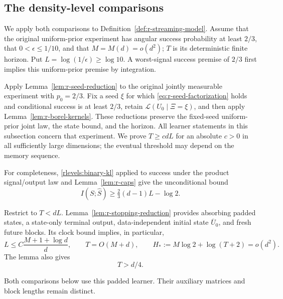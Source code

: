 \subsection{The density-level comparisons}
\label{rlevels:endpoints}

We apply both comparisons to Definition~\ref{def:r-streaming-model}.
Assume that the original uniform-prior experiment has angular success
probability at least \(2/3\), that \(0<\epsilon\le1/10\), and that
\(M=M(d)=o(d^2)\); \(T\) is its deterministic finite horizon.  Put
\(L=\log(1/\epsilon)\ge\log10\).  A worst-signal success premise of
\(2/3\) first implies this uniform-prior premise by integration.

Apply Lemma~\ref{lem:r-seed-reduction} to the original jointly
measurable experiment with \(p_0=2/3\).  Fix a seed \(\xi\) for which
\eqref{eq:r-seed-factorization} holds and conditional success is at
least \(2/3\), retain \(\mathcal L(U_0\mid\Xi=\xi)\), and then apply
Lemma~\ref{lem:r-borel-kernels}.  These reductions preserve the fixed-seed
uniform-prior joint law, the state bound, and the horizon.  All learner
statements in this subsection concern that experiment.  We prove
\(T\ge c dL\) for an absolute \(c>0\) in all sufficiently large
dimensions; the eventual threshold may depend on the memory sequence.

For completeness, \eqref{rlevels:binary-kl} applied to success
under the product signal/output law and Lemma~\ref{lem:r-caps}
give the unconditional bound
\begin{equation}\label{rlevels:output-information}
 I(S;\widehat S)\ge\tfrac23(d-1)L-\log2.
\end{equation}

Restrict to \(T<dL\).  Lemma~\ref{lem:r-stopping-reduction}
provides absorbing padded states, a state-only terminal output,
data-independent initial state \(\overline U_0\), and fresh future
blocks.  Its clock bound implies, in particular,
\begin{equation}\label{rlevels:clock}
 L\le C\frac{M+1+\log d}{d},\qquad T=O(M+d),\qquad
 H_*:=M\log2+\log(T+2)=o(d^2).
\end{equation}
The lemma also gives
\begin{equation}\label{rlevels:linear}
 T>d/4.
\end{equation}

Both comparisons below use this padded learner.  Their auxiliary
matrices and block lengths remain distinct.

